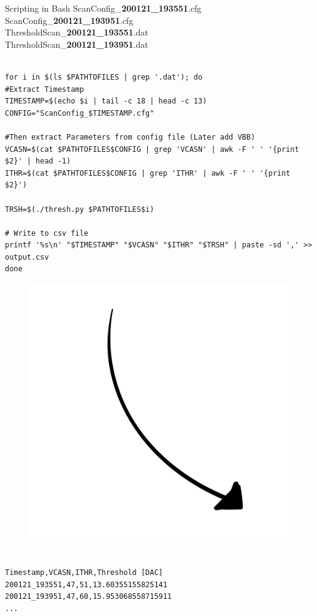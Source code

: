 \begin{frame}[fragile]{Scripting in Bash}
\small
ScanConfig\_\textbf{200121\_193551}.cfg \\
ScanConfig\_\textbf{200121\_193951}.cfg \\
ThresholdScan\_\textbf{200121\_193551}.dat \\
ThresholdScan\_\textbf{200121\_193951}.dat \\
\pause
\begin{lstlisting}

for i in $(ls $PATHTOFILES | grep '.dat'); do
#Extract Timestamp
TIMESTAMP=$(echo $i | tail -c 18 | head -c 13)
CONFIG="ScanConfig_$TIMESTAMP.cfg"

#Then extract Parameters from config file (Later add VBB)
VCASN=$(cat $PATHTOFILES$CONFIG | grep 'VCASN' | awk -F ' ' '{print $2}' | head -1)
ITHR=$(cat $PATHTOFILES$CONFIG | grep 'ITHR' | awk -F ' ' '{print $2}')

TRSH=$(./thresh.py $PATHTOFILES$i)

# Write to csv file
printf '%s\n' "$TIMESTAMP" "$VCASN" "$ITHR" "$TRSH" | paste -sd ',' >> output.csv
done
\end{lstlisting}
\pause
\begin{minipage}{.2\textwidth}
    \begin{figure}[H]
	\centering
	\includegraphics[width=.5\textwidth]{Arrow2.png}
    \end{figure}
\end{minipage}
\begin{minipage}{.79\textwidth}
\begin{lstlisting}

Timestamp,VCASN,ITHR,Threshold [DAC]
200121_193551,47,51,13.60355155825141
200121_193951,47,60,15.953068558715911
...
\end{lstlisting}
\end{minipage}
\end{frame}

